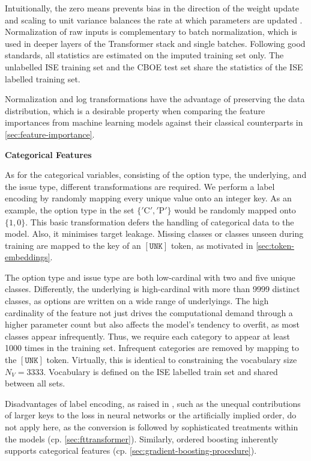 Intuitionally, the zero means prevents bias in the direction of the weight update and scaling to unit variance balances the rate at which parameters are updated \autocite[][8]{lecunEfficientBackProp2012}. Normalization of raw inputs is complementary to batch normalization, which is used in deeper layers of the Transformer stack and single batches. Following good standards, all statistics are estimated on the imputed training set only. The unlabelled \gls{ISE} training set and the \gls{CBOE} test set share the statistics of the \gls{ISE} labelled training set.

Normalization and log transformations have the advantage of preserving the data distribution, which is a desirable property when comparing the feature importances from machine learning models against their classical counterparts in \cref{sec:feature-importance}.

\textbf{Categorical Features}

As for the categorical variables, consisting of the option type, the underlying, and the issue type, different transformations are required. We perform a label encoding by randomly mapping every unique value onto an integer key. As an example, the option type in the set $\{\mathrm{'C'},\mathrm{'P'}\}$ would be randomly mapped onto $\{1,0\}$. This basic transformation defers the handling of categorical data to the model. Also, it minimises target leakage. Missing classes or classes unseen during training are mapped to the key of an $\mathtt{[UNK]}$ \gls{token}, as motivated in \cref{sec:token-embeddings}.

The option type and issue type are both low-cardinal with two and five unique classes. Differently, the underlying is high-cardinal with more than \num{9999} distinct classes, as options are written on a wide range of underlyings. The high cardinality of the feature not just drives the computational demand through a higher parameter count but also affects the model's tendency to overfit, as most classes appear infrequently. Thus, we require each category to appear at least \num{1000} times in the training set. Infrequent categories are removed by mapping to the $\mathtt{[UNK]}$ \gls{token}. Virtually, this is identical to constraining the vocabulary size $N_V = \num{3333}$. Vocabulary is defined on the \gls{ISE} labelled train set and shared between all sets.

Disadvantages of label encoding, as raised in \textcite[][12]{hancockSurveyCategoricalData2020}, such as the unequal contributions of larger keys to the loss in neural networks or the artificially implied order, do not apply here, as the conversion is followed by sophisticated treatments within the models (cp. \cref{sec:fttransformer}). Similarly, ordered boosting inherently supports categorical features (cp. \cref{sec:gradient-boosting-procedure}).

